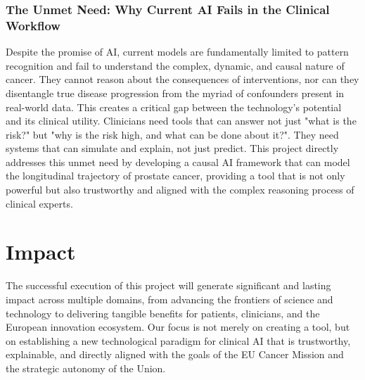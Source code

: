 \documentclass[11pt, a4paper]{article}
\begin{document}
\subsubsection{The Unmet Need: Why Current AI Fails in the Clinical Workflow}
Despite the promise of AI, current models are fundamentally limited to pattern recognition and fail to understand the complex, dynamic, and causal nature of cancer. They cannot reason about the consequences of interventions, nor can they disentangle true disease progression from the myriad of confounders present in real-world data. This creates a critical gap between the technology's potential and its clinical utility. Clinicians need tools that can answer not just "what is the risk?" but "why is the risk high, and what can be done about it?". They need systems that can simulate and explain, not just predict. This project directly addresses this unmet need by developing a causal AI framework that can model the longitudinal trajectory of prostate cancer, providing a tool that is not only powerful but also trustworthy and aligned with the complex reasoning process of clinical experts.

\section{Impact}
The successful execution of this project will generate significant and lasting impact across multiple domains, from advancing the frontiers of science and technology to delivering tangible benefits for patients, clinicians, and the European innovation ecosystem. Our focus is not merely on creating a tool, but on establishing a new technological paradigm for clinical AI that is trustworthy, explainable, and directly aligned with the goals of the EU Cancer Mission and the strategic autonomy of the Union.
\end{document}
